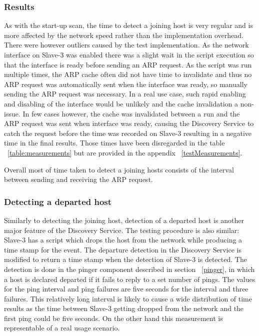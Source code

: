 \subsubsection*{Results}

As with the start-up scan, the time to detect a joining host is very regular and is more affected by the network speed rather than the implementation overhead. There were however outliers caused by the test implementation. As the network interface on Slave-3 was enabled there was a slight wait in the script execution so that the interface is ready before sending an ARP request. As the script was run multiple times, the ARP cache often did not have time to invalidate and thus no ARP request was automatically sent when the interface was ready, so manually sending the ARP request was necessary. In a real use case, such rapid enabling and disabling of the interface would be unlikely and the cache invalidation a non-issue. In few cases however, the cache was invalidated between a run and the ARP request was sent when interface was ready, causing the Discovery Service to catch the request before the time was recorded on Slave-3 resulting in a negative time in the final results. Those times have been disregarded in the table ~\ref{table:measurements} but are provided in the appendix ~\ref{testMeasurements}.

Overall most of time taken to detect a joining hosts consists of the interval between sending and receiving the ARP request.

\subsubsection{Detecting a departed host}

Similarly to detecting the joining host, detection of a departed host is another major feature of the Discovery Service. The testing procedure is also similar: Slave-3 has a script which drops the host from the network while producing a time stamp for the event. The departure detection in the Discovery Service is modified to return a time stamp when the detection of Slave-3 is detected. The detection is done in the pinger component described in section ~\ref{pinger}, in which a host is declared departed if it fails to reply to a set number of pings. The values for the ping interval and ping failures are five seconds for the interval and three failures. This relatively long interval is likely to cause a wide distribution of time results as the time between Slave-3 getting dropped from the network and the first ping could be five seconds. On the other hand this measurement is representable of a real usage scenario. \newline 

